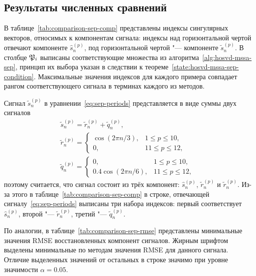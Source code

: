 \documentclass[specialist,
    substylefile = spbu.rtx,
    subf,href,colorlinks=true, 12pt]{disser}
\theoremstyle{plain}
\theoremstyle{definition}
\theoremstyle{remark}
\begin{document}
    
    \subsection{Результаты численных сравнений}\label{subsec:numerical-comp-sep}
    В таблице~\ref{tab:comparison-sep-comp} представлены индексы сингулярных векторов, относимых
    к компонентам сигнала: индексы над горизонтальной чертой отвечают компоненте $\hat{s}_n^{(p)}$,
    под горизонтальной чертой "--- компоненте $\tilde{s}_n^{(p)}$.
    В столбце $\mathfrak{P}_i$ выписаны соответствующие множества из алгоритма~\ref{alg:hosvd-mssa-sep}, 
    принцип их выбора указан в следствии к теореме~\ref{state:hosvd-mssa-sep-condition}.
    Максимальные значения индексов для каждого примера совпадает рангом соответствующего сигнала в терминах
    каждого из методов.
    
    Сигнал $\tilde{s}_n^{(p)}$ в уравнении~\eqref{eq:sep-periods} представляется в виде суммы двух сигналов
    \begin{gather*}
        \tilde{s}_n^{(p)} = \tilde{r}_n^{(p)} + \tilde{q}_n^{(p)},\\
        \tilde{r}_n^{(p)} = \begin{cases}
            \cos(2\pi n /3), & 1 \leqslant p \leqslant 10,\\
            0, & 11 \leqslant p \leqslant 12,
        \end{cases} \\
        \tilde{q}_n^{(p)} = \begin{cases}
            0, & 1 \leqslant p \leqslant 10,\\
            0.4 \cos(2 \pi n / 6), & 11 \leqslant p \leqslant 12,
        \end{cases}
    \end{gather*}
    поэтому считается, что сигнал состоит из трёх компонент: $\hat{s}_n^{(p)}$, $\tilde{r}_n^{(p)}$ и 
    $\tilde{r}_n^{(p)}$.
    Из-за этого в таблице~\ref{tab:comparison-sep-comp} в строке, отвечающей сигналу~\eqref{eq:sep-periods} выписаны
    три набора индексов: первый соответствует $\hat{s}_n^{(p)}$, второй "--- $\tilde{r}_n^{(p)}$, 
    третий "--- $\tilde{q}_n^{(p)}$.
    
    По аналогии, в таблице~\ref{tab:comparison-sep-rmse} представлены минимальные значения RMSE восстановленных
    компонент сигналов.
    Жирным шрифтом выделены минимальные по методам значения RMSE для данного сигнала.
    Отличие выделенных значений от остальных в строке значимо при уровне значимости $\alpha=0.05$.
    
\end{document}
